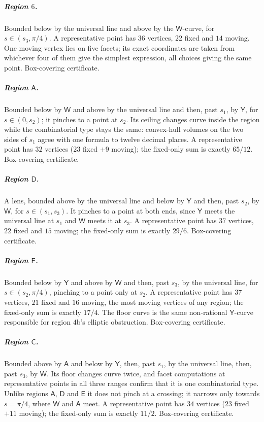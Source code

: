 \documentclass[11pt,reqno]{amsart}
\renewcommand{\_}{\origunderscore\allowbreak}
\numberwithin{equation}{section}
\theoremstyle{plain}
\theoremstyle{definition}
\theoremstyle{remark}
\newcommand{\arcp}{s}                        %
\begin{document}
\subparagraph{Region $6$.} Bounded below by the universal line and above
by the $\mathsf W$-curve, for $\arcp\in(\arcp_3,\pi/4)$. A
representative point has $36$ vertices, $22$ fixed and $14$ moving. One
moving vertex lies on five facets; its exact coordinates are taken from
whichever four of them give the simplest expression, all choices giving
the same point. Box-covering certificate.

\subparagraph{Region $\mathsf A$.} Bounded below by $\mathsf W$ and above
by the universal line and then, past $\arcp_1$, by $\mathsf Y$, for
$\arcp\in(0,\arcp_2)$; it pinches to a point at $\arcp_2$. Its ceiling
changes curve inside the region while the combinatorial type stays the
same: convex-hull volumes on the two sides of $\arcp_1$ agree with one
formula to twelve decimal places. A representative point has $32$
vertices ($23$ fixed $+9$ moving); the fixed-only sum is exactly $65/12$. Box-covering
certificate.

\subparagraph{Region $\mathsf D$.} A lens, bounded above by the universal
line and below by $\mathsf Y$ and then, past $\arcp_2$, by $\mathsf W$,
for $\arcp\in(\arcp_1,\arcp_3)$. It pinches to a point at both ends,
since $\mathsf Y$ meets the universal line at $\arcp_1$ and $\mathsf W$
meets it at $\arcp_3$. A representative point has $37$ vertices, $22$
fixed and $15$ moving; the fixed-only sum is exactly $29/6$.
Box-covering certificate.

\subparagraph{Region $\mathsf E$.} Bounded below by $\mathsf Y$ and above
by $\mathsf W$ and then, past $\arcp_3$, by the universal line, for
$\arcp\in(\arcp_2,\pi/4)$, pinching to a point only at $\arcp_2$. A
representative point has $37$ vertices, $21$ fixed and $16$ moving, the
most moving vertices of any region; the fixed-only sum is exactly $17/4$. The floor
curve is the same non-rational $\mathsf Y$-curve responsible for region
$4$b's elliptic obstruction. Box-covering certificate.

\subparagraph{Region $\mathsf C$.} Bounded above by $\mathsf A$ and below
by $\mathsf Y$, then, past $\arcp_1$, by the universal line, then, past
$\arcp_3$, by $\mathsf W$. Its floor changes curve twice, and facet
computations at representative points in all three ranges confirm that
it is one combinatorial type. Unlike regions $\mathsf A$, $\mathsf D$
and $\mathsf E$ it does not pinch at a crossing; it narrows only towards
$\arcp=\pi/4$, where $\mathsf W$ and $\mathsf A$ meet. A representative
point has $34$ vertices ($23$ fixed $+11$ moving); the fixed-only sum
is exactly $11/2$. Box-covering certificate.
\end{document}
